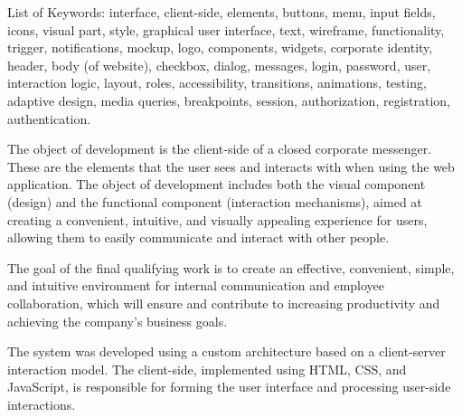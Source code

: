 List of Keywords: interface, client-side, elements, buttons, menu, input fields, icons, visual part, style, graphical user interface, text, wireframe, functionality, trigger, notifications, mockup, logo, components, widgets, corporate identity, header, body (of website), checkbox, dialog, messages, login, password, user, interaction logic, layout, roles, accessibility, transitions, animations, testing, adaptive design, media queries, breakpoints, session, authorization, registration, authentication.

The object of development is the client-side of a closed corporate messenger. These are the elements that the user sees and interacts with when using the web application. The object of development includes both the visual component (design) and the functional component (interaction mechanisms), aimed at creating a convenient, intuitive, and visually appealing experience for users, allowing them to easily communicate and interact with other people.

The goal of the final qualifying work is to create an effective, convenient, simple, and intuitive environment for internal communication and employee collaboration, which will ensure and contribute to increasing productivity and achieving the company's business goals.

The system was developed using a custom architecture based on a client-server interaction model. The client-side, implemented using HTML, CSS, and JavaScript, is responsible for forming the user interface and processing user-side interactions.
